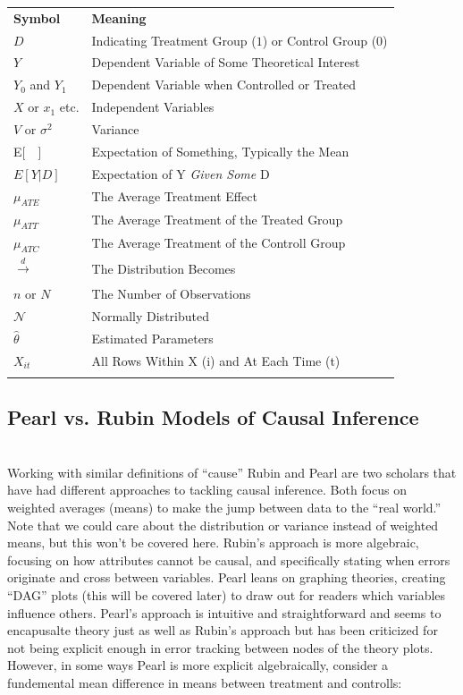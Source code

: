\documentclass[12pt]{article}\usepackage[]{graphicx}\usepackage[]{color}
\begin{document}
\begin{flushleft}
\begin{longtable}{ll}
\hline\noalign{\smallskip}
\textbf{Symbol} & \textbf{Meaning} \\
\noalign{\smallskip}\hline\noalign{\smallskip}
$D$ & Indicating Treatment Group ($1$) or Control Group ($0$)\\
$Y$ & Dependent Variable of Some Theoretical Interest        \\
$Y_0$ and $Y_1$ & Dependent Variable when Controlled or Treated\\
$X$ or $x_1$ etc. & Independent Variables\\
$V$ or $\sigma^2$ & Variance\\
E[~~]  & Expectation of Something, Typically the Mean\\
$E[Y |D]$ & Expectation of Y \textit{Given Some} D\\
$\mu_{ATE}$ & The Average Treatment Effect\\
$\mu_{ATT}$ & The Average Treatment of the Treated Group\\
$\mu_{ATC}$ & The Average Treatment of the Controll Group\\
$\xrightarrow[]{d}$ & The Distribution Becomes\\
$n$ or $N$ & The Number of Observations\\
$\mathcal{N}$ & Normally Distributed\\
$\hat{\theta}$ & Estimated Parameters\\
$X_{it}$ & All Rows Within X (i) and At Each Time (t)\\
\noalign{\smallskip}\hline\noalign{\smallskip}
\end{longtable}


\clearpage



\subsection{Pearl vs. Rubin Models of Causal Inference}
\hfill \\

Working with similar definitions of ``cause'' Rubin and Pearl are two scholars that have had different approaches to tackling causal inference. Both focus on weighted averages (means) to make the jump between data to the ``real world.'' Note that we could care about the distribution or variance instead of weighted means, but this won't be covered here. Rubin's approach is more algebraic, focusing on how attributes cannot be causal, and specifically stating when errors originate and cross between variables. Pearl leans on graphing theories, creating ``DAG'' plots (this will be covered later) to draw out for readers which variables influence others. Pearl's approach is intuitive and straightforward and seems to encapusalte theory just as well as Rubin's approach but has been criticized for not being explicit enough in error tracking between nodes of the theory plots. However, in some ways Pearl is more explicit algebraically, consider a fundemental mean difference in means between treatment and controlls:


\end{flushleft}
\end{document}
